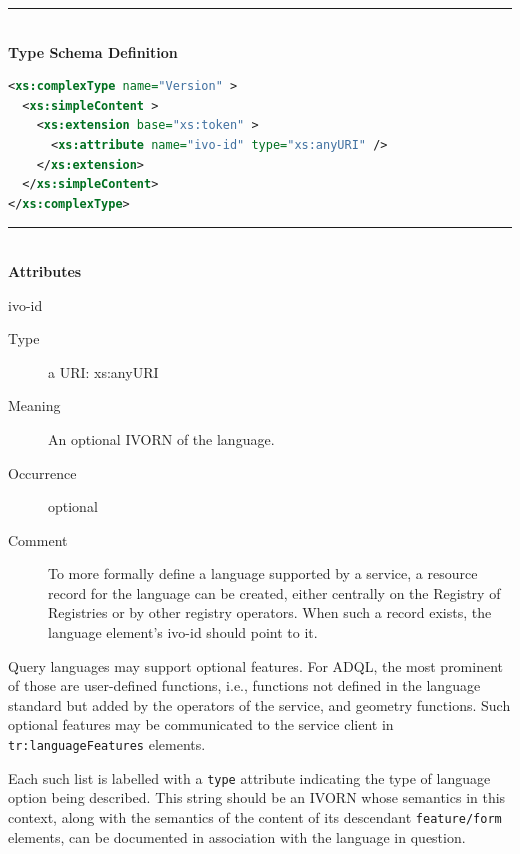 \documentclass{ivoa}
\begin{document}

\noindent\rule[-2pt]{\textwidth}{0.5pt}\\
			\textbf{ Type Schema Definition}

\begin{lstlisting}[language=XML]
<xs:complexType name="Version" >
  <xs:simpleContent >
    <xs:extension base="xs:token" >
      <xs:attribute name="ivo-id" type="xs:anyURI" />
    </xs:extension>
  </xs:simpleContent>
</xs:complexType>
\end{lstlisting}

\noindent\rule[-2pt]{\textwidth}{0.5pt}\\
					\textbf{ Attributes}

\begin{bigdescription}
\item[ivo-id]
\begin{description}
\item[Type\quad] a URI: xs:anyURI
\item[Meaning\quad] 
    				An optional IVORN of the language.
    				
\item[Occurrence\quad] optional
\item[Comment\quad] 
    					To more formally define a language supported by a service,
    					a resource record for the language can be created, either
    					centrally on the Registry of Registries or by other registry operators.  
    					When such a record exists, the language element's ivo-id
    					should point to it.
    				
\end{description}


\end{bigdescription}




Query languages may support optional features.  For ADQL, the most prominent
of those are user-defined functions, i.e., functions not defined in the language
standard but added by the operators of the service, and geometry functions.
Such optional features may be communicated to the service client in
\texttt{tr:languageFeatures} elements.  

Each such list is labelled with a \texttt{type} attribute
indicating the type of language option being described.
This string should be an IVORN whose semantics in this context,
along with the semantics of the content of its descendant 
\texttt{feature/form} elements,
can be documented in association with the language in question.
\end{document}
